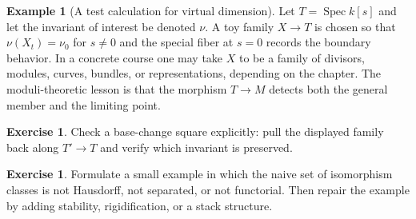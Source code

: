 \documentclass[11pt]{amsart}
\theoremstyle{definition}
\newtheorem{example}[theorem]{Example}
\newtheorem{exercise}[theorem]{Exercise}
\newcommand{\Spec}{\operatorname{Spec}}
\begin{document}
\begin{example}[A test calculation for virtual dimension]
Let $T=\Spec k[s]$ and let the invariant of interest be denoted $\nu$.  A toy family $X\to T$ is chosen so that $\nu(X_t)=\nu_0$ for $s\ne0$ and the special fiber at $s=0$ records the boundary behavior.  In a concrete course one may take $X$ to be a family of divisors, modules, curves, bundles, or representations, depending on the chapter.  The moduli-theoretic lesson is that the morphism $T\to M$ detects both the general member and the limiting point.
\end{example}
\begin{exercise}
Check a base-change square explicitly: pull the displayed family back along $T\prime\to T$ and verify which invariant is preserved.
\end{exercise}
\begin{exercise}
Formulate a small example in which the naive set of isomorphism classes is not Hausdorff, not separated, or not functorial.  Then repair the example by adding stability, rigidification, or a stack structure.
\end{exercise}
\clearpage
\end{document}
